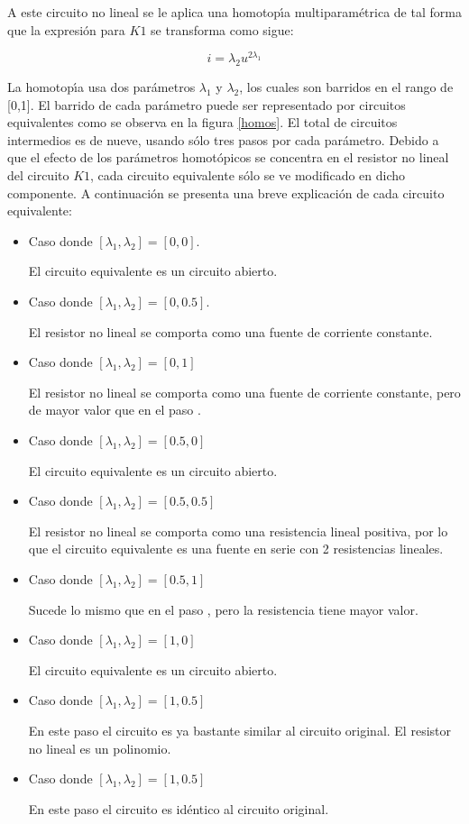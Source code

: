 \documentclass[conference,letterpaper,onecolumn]{IEEEtran}
\begin{document}
A este circuito no lineal se le aplica una homotop\'{\i}a
multiparam\'etrica de tal forma que la expresi\'on para $K1$
se transforma como sigue:

\begin{displaymath}
i=\lambda_2 u^{2\lambda_1}
\end{displaymath}

La homotop\'{\i}a usa dos par\'ametros  $\lambda_1$ y $\lambda_2$,
los cuales son barridos en el rango de  [0,1]. El barrido
de cada par\'ametro puede ser representado por circuitos 
equivalentes como se observa en la figura \ref{homos}. El total de
circuitos intermedios es de nueve, usando s\'olo tres 
pasos
por cada par\'ametro.
Debido a que el efecto de los par\'ametros homot\'opicos
se concentra en el resistor no lineal del circuito $K1$, cada
circuito equi\-va\-lente s\'olo se ve modificado en dicho componente.
A continuaci\'on se presenta una breve explicaci\'on
de cada circuito equivalente:

\begin{itemize}
\item Caso  donde $[\lambda_1, \lambda_2]=[0,0]$.

El circuito equivalente es un circuito abierto.
\item Caso  donde $[\lambda_1, \lambda_2]=[0,0.5]$.

El resistor no lineal se comporta como una fuente de corriente constante.
\item Caso   donde $[\lambda_1, \lambda_2]=[0,1]$

El resistor no lineal se comporta como una fuente de corriente constante, pero
de mayor valor que en el paso .
\item Caso   donde $[\lambda_1, \lambda_2]=[0.5,0]$ 

El circuito equivalente es un circuito abierto.
\item Caso   donde $[\lambda_1, \lambda_2]=[0.5,0.5]$

 El resistor no lineal se comporta como una resistencia lineal positiva, por lo que
el circuito equivalente es una fuente en serie con 2 resistencias lineales.
\item Caso   donde $[\lambda_1, \lambda_2]=[0.5,1]$ 

Sucede lo mismo que en el paso , pero la resistencia tiene mayor valor.
\item Caso   donde $[\lambda_1, \lambda_2]=[1,0]$ 

El circuito equivalente es un circuito abierto.
\item Caso   donde $[\lambda_1, \lambda_2]=[1,0.5]$ 

En este paso el circuito es ya bastante similar al circuito original. El resistor
no lineal es un polinomio.
\item Caso   donde $[\lambda_1, \lambda_2]=[1,0.5]$ 

En este paso el circuito es id\'entico al circuito original.
\end{itemize}
\end{document}
